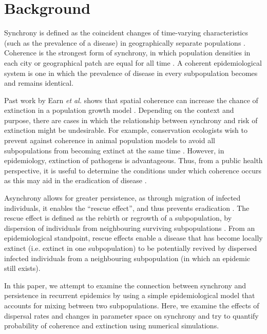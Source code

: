 \documentclass[12pt]{article}
\begin{document}
\tableofcontents

\section{Background}
 
Synchrony is defined as the coincident changes of time-varying characteristics (such as the prevalence of a disease) in geographically separate populations \cite{liebhold2004spatial}. Coherence is the strongest form of synchrony, in which population densities in each city or geographical patch are equal for all time \cite{earn2006global}. A coherent epidemiological system is one in which the prevalence of disease in every subpopulation becomes and remains identical.

Past work by Earn \textit{et al.} shows that spatial coherence can increase the chance of extinction in a population growth model \cite{Earn2000conservation}. 
Depending on the context and purpose, there are cases in which the relationship between synchrony and risk of extinction might be undesirable.
For example, conservation ecologists wish to prevent against coherence in animal population models to avoid all subpopulations from becoming extinct at the same time \cite{Earn2000conservation}. However, in epidemiology, extinction of pathogens is advantageous. Thus, from a public health perspective, it is useful to determine the conditions under which coherence occurs as this may aid in the eradication of disease \cite{earn1998persistence}. 

Asynchrony allows for greater persistence, as through migration of infected individuals, it enables the ``rescue effect'', and thus prevents eradication \cite{brown1977turnover}. 
The rescue effect is defined as the rebirth or regrowth of a subpopulation, by dispersion of individuals from neighbouring surviving subpopulations \cite{nicholson1935balance,levins1969some,adler1993migration}. 
From an epidemiological standpoint, rescue effects enable a disease that has become locally extinct (i.e. extinct in one subpopulation) to be potentially revived by dispersed infected individuals from a neighbouring subpopulation (in which an epidemic still exists).

In this paper, we attempt to examine the connection between synchrony and persistence in recurrent epidemics by using a simple epidemiological model that accounts for mixing between two subpopulations.
Here, we examine the effects of dispersal rates and changes in parameter space on synchrony and try to quantify probability of coherence and extinction using numerical simulations.
\end{document}
